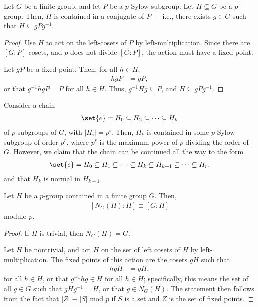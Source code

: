 \documentclass[10pt]{mypackage}
\begin{document}
\begin{theorem}
  Let $G$ be a finite group, and let $P$ be a $p$-Sylow subgroup. Let $H\subseteq G$ be a $p$-group. Then, $H$ is contained in a conjugate of $P$ --- i.e., there exists $g\in G$ such that $H\subseteq gPg^{-1}$.
\end{theorem}
\begin{proof}
  Use $H$ to act on the left-cosets of $P$ by left-multiplication. Since there are $\left[ G:P \right]$ cosets, and $p$ does not divide $\left[ G:P \right]$, the action must have a fixed point.\newline

  Let $gP$ be a fixed point. Then, for all $h\in H$, 
  \begin{align*}
    hgP &= gP,
  \end{align*}
  or that $g^{-1}hgP = P$ for all $h\in H$. Thus, $g^{-1}Hg\subseteq P$, and $H\subseteq gPg^{-1}$.
\end{proof}
Consider a chain
\begin{align*}
  \set{e} = H_0\subseteq H_2\subseteq \cdots \subseteq H_k
\end{align*}
of $p$-subgroups of $G$, with $\left\vert H_i \right\vert = p^{i}$. Then, $H_k$ is contained in some $p$-Sylow subgroup of order $p^{r}$, where $p^{r}$ is the maximum power of $p$ dividing the order of $G$. However, we claim that the chain can be continued all the way to the form
\begin{align*}
  \set{e} = H_0 \subseteq H_1\subseteq \cdots \subseteq H_k\subseteq H_{k+1}\subseteq \cdots \subseteq H_{r},
\end{align*}
and that $H_{k}$ is normal in $H_{k+1}$.
\begin{lemma}
  Let $H$ be a $p$-group contained in a finite group $G$. Then,
  \begin{align*}
    \left[ N_G(H) : H \right] \equiv \left[ G:H \right]
  \end{align*}
  modulo $p$.
\end{lemma}
\begin{proof}
  If $H$ is trivial, then $N_G(H) = G$.\newline

  Let $H$ be nontrivial, and act $H$ on the set of left cosets of $H$ by left-multiplication. The fixed points of this action are the cosets $gH$ such that
  \begin{align*}
    hgH &= gH,
  \end{align*}
  for all $h\in H$, or that $g^{-1}hg\in H$ for all $h\in H$; specifically, this means the set of all $g\in G$ such that $g H g^{-1} = H$, or that $g\in N_G(H)$. The statement then follows from the fact that $\left\vert Z \right\vert \equiv \left\vert S \right\vert$ mod $p$ if $S$ is a set and $Z$ is the set of fixed points.
\end{proof}
\end{document}
